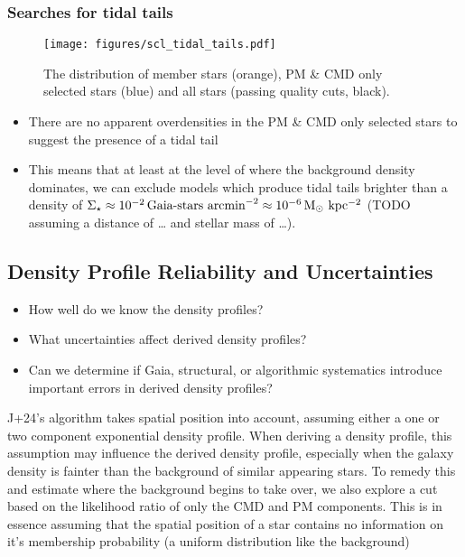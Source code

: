 \subsubsection{Searches for tidal tails}\label{searches-for-tidal-tails}

\begin{figure}
\centering
\texttt{[image: figures/scl\_tidal\_tails.pdf]}
\caption[Tidal tails]{The distribution of member stars (orange), PM \&
CMD only selected stars (blue) and all stars (passing quality cuts,
black).}\label{fig:sculptor_tidal_tails}
\end{figure}

\begin{itemize}
\item
  There are no apparent overdensities in the PM \& CMD only selected
  stars to suggest the presence of a tidal tail
\item
  This means that at least at the level of where the background density
  dominates, we can exclude models which produce tidal tails brighter
  than a density of
  \(\Sigma_\star \approx 10^{-2}\,\text{Gaia-stars\ arcmin}^{-2} \approx 10^{-6} \, {\rm M_\odot\ kpc^{-2}}\)
  (TODO assuming a distance of \ldots{} and stellar mass of \ldots).
\end{itemize}

\subsection{Density Profile Reliability and
Uncertainties}\label{density-profile-reliability-and-uncertainties}

\begin{itemize}
\tightlist
\item
  How well do we know the density profiles?
\item
  What uncertainties affect derived density profiles?
\item
  Can we determine if Gaia, structural, or algorithmic systematics
  introduce important errors in derived density profiles?
\end{itemize}

J+24's algorithm takes spatial position into account, assuming either a
one or two component exponential density profile. When deriving a
density profile, this assumption may influence the derived density
profile, especially when the galaxy density is fainter than the
background of similar appearing stars. To remedy this and estimate where
the background begins to take over, we also explore a cut based on the
likelihood ratio of only the CMD and PM components. This is in essence
assuming that the spatial position of a star contains no information on
it's membership probability (a uniform distribution like the background)


